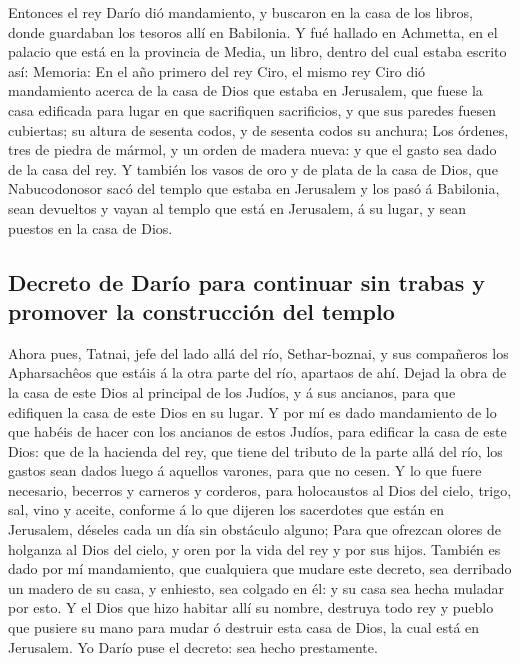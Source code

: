  Entonces el rey Darío dió mandamiento, y buscaron en la
casa de los libros, donde guardaban los tesoros allí en Babilonia.
 Y fué hallado en Achmetta, en el palacio que está en la
provincia de Media, un libro, dentro del cual estaba escrito así:
Memoria:  En el año primero del rey Ciro, el mismo rey Ciro
dió mandamiento acerca de la casa de Dios que estaba en Jerusalem, que
fuese la casa edificada para lugar en que sacrifiquen sacrificios, y que
sus paredes fuesen cubiertas; su altura de sesenta codos, y de sesenta
codos su anchura;  Los órdenes, tres de piedra de mármol, y
un orden de madera nueva: y que el gasto sea dado de la casa del rey.
 Y también los vasos de oro y de plata de la casa de Dios,
que Nabucodonosor sacó del templo que estaba en Jerusalem y los pasó á
Babilonia, sean devueltos y vayan al templo que está en Jerusalem, á su
lugar, y sean puestos en la casa de Dios.

\hypertarget{decreto-de-daruxedo-para-continuar-sin-trabas-y-promover-la-construcciuxf3n-del-templo}{%
\subsection{Decreto de Darío para continuar sin trabas y promover la
construcción del
templo}\label{decreto-de-daruxedo-para-continuar-sin-trabas-y-promover-la-construcciuxf3n-del-templo}}

 Ahora pues, Tatnai, jefe del lado allá del río,
Sethar-boznai, y sus compañeros los Apharsachêos que estáis á la otra
parte del río, apartaos de ahí.  Dejad la obra de la casa de
este Dios al principal de los Judíos, y á sus ancianos, para que
edifiquen la casa de este Dios en su lugar.  Y por mí es
dado mandamiento de lo que habéis de hacer con los ancianos de estos
Judíos, para edificar la casa de este Dios: que de la hacienda del rey,
que tiene del tributo de la parte allá del río, los gastos sean dados
luego á aquellos varones, para que no cesen.  Y lo que fuere
necesario, becerros y carneros y corderos, para holocaustos al Dios del
cielo, trigo, sal, vino y aceite, conforme á lo que dijeren los
sacerdotes que están en Jerusalem, déseles cada un día sin obstáculo
alguno;  Para que ofrezcan olores de holganza al Dios del
cielo, y oren por la vida del rey y por sus hijos.  También
es dado por mí mandamiento, que cualquiera que mudare este decreto, sea
derribado un madero de su casa, y enhiesto, sea colgado en él: y su casa
sea hecha muladar por esto.  Y el Dios que hizo habitar
allí su nombre, destruya todo rey y pueblo que pusiere su mano para
mudar ó destruir esta casa de Dios, la cual está en Jerusalem. Yo Darío
puse el decreto: sea hecho prestamente.

